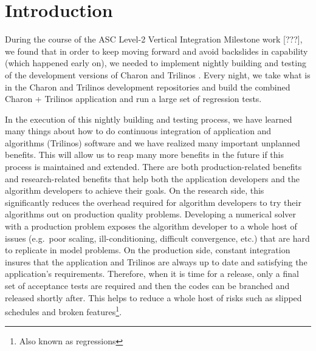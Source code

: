 \documentclass[pdf,ps2pdf,11pt]{SANDreport}
\begin{document}

%

\SANDmain %

%
\section{Introduction}
%

During the course of the ASC Level-2 Vertical Integration Milestone work
[???], we found that in order to keep moving forward and avoid backslides in
capability (which happened early on), we needed to implement nightly building
and testing of the development versions of Charon and Trilinos
{}\cite{ref:trilinos}.  Every night, we take what is in the Charon and
Trilinos development repositories and build the combined Charon + Trilinos
application and run a large set of regression tests.

In the execution of this nightly building and testing process, we have learned
many things about how to do continuous integration
{}\cite{continuous-integration} of application and algorithms (Trilinos)
software and we have realized many important unplanned benefits.  This will
allow us to reap many more benefits in the future if this process is
maintained and extended.  There are both production-related benefits and
research-related benefits that help both the application developers and the
algorithm developers to achieve their goals.  On the research side, this
significantly reduces the overhead required for algorithm developers to try
their algorithms out on production quality problems.  Developing a numerical
solver with a production problem exposes the algorithm developer to a whole
host of issues (e.g.\ poor scaling, ill-conditioning, difficult convergence,
etc.) that are hard to replicate in model problems.  On the production side,
constant integration insures that the application and Trilinos are always up
to date and satisfying the application's requirements.  Therefore, when it is
time for a release, only a final set of acceptance tests are required and then
the codes can be branched and released shortly after.  This helps to reduce a
whole host of risks such as slipped schedules and broken
features\footnote{Also known as regressions}.
\end{document}
